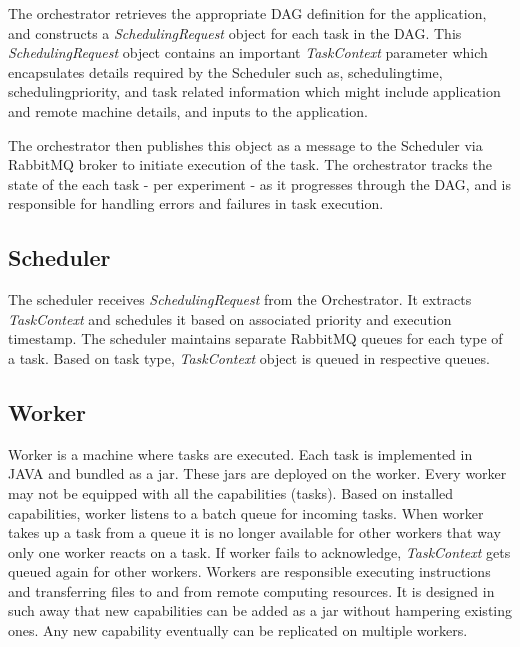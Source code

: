 \documentclass[sigconf]{acmart}
\begin{document}
The orchestrator retrieves the appropriate DAG definition for the application, and constructs a \textit{SchedulingRequest} object for each task in the DAG. This \textit{SchedulingRequest} object contains an important \textit{TaskContext} parameter which encapsulates details required by the Scheduler such as, scheduling\textunderscore time, scheduling\textunderscore priority, and task related information which might include application and remote machine details, and inputs to the application. \newline

The orchestrator then publishes this object as a message to the Scheduler via RabbitMQ broker to initiate execution of the task. The orchestrator tracks the state of the each task - per experiment - as it progresses through the DAG, and is responsible for handling errors and failures in task execution.

\subsection{Scheduler}
The scheduler receives \textit{SchedulingRequest} from the Orchestrator. It extracts \textit{TaskContext} and schedules it based on associated priority and execution timestamp. The scheduler maintains separate RabbitMQ queues for each type of a task. Based on task type, \textit{TaskContext} object is queued in respective queues.

\subsection{Worker}
Worker is a  machine where tasks are executed. Each task is implemented in JAVA and bundled as a jar. These jars are deployed on the worker. Every worker may not be equipped with all the capabilities (tasks). Based on installed capabilities, worker listens to a batch queue for incoming tasks. When worker takes up a task from a queue it is no longer available for other workers that way only one worker reacts on a task. If worker fails to acknowledge, \textit{TaskContext} gets queued again for other workers. Workers are responsible executing instructions and transferring files to and from remote computing resources. It is designed in such  away that new capabilities can be added as a jar without hampering existing ones. Any new capability eventually can be replicated on multiple workers. 
\end{document}
